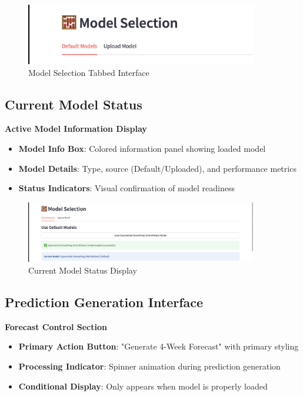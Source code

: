 \begin{figure}[H]
    \centering
    \includegraphics[width=0.9\textwidth]{Images/04GUIAndUserInterface/ModelTabs.png}
    \caption{Model Selection Tabbed Interface}
    \label{fig:model_tabs}
\end{figure}

\subsection{Current Model Status}

\textbf{Active Model Information Display}

\begin{itemize}
    \item \textbf{Model Info Box}: Colored information panel showing loaded model
    \item \textbf{Model Details}: Type, source (Default/Uploaded), and performance metrics
    \item \textbf{Status Indicators}: Visual confirmation of model readiness
\end{itemize}

\begin{figure}[H]
    \centering
    \includegraphics[width=0.9\textwidth]{Images/04GUIAndUserInterface/ModelStatus.png}
    \caption{Current Model Status Display}
    \label{fig:model_status}
\end{figure}

\subsection{Prediction Generation Interface}

\textbf{Forecast Control Section}

\begin{itemize}
    \item \textbf{Primary Action Button}: "Generate 4-Week Forecast" with primary styling
    \item \textbf{Processing Indicator}: Spinner animation during prediction generation
    \item \textbf{Conditional Display}: Only appears when model is properly loaded
\end{itemize}

